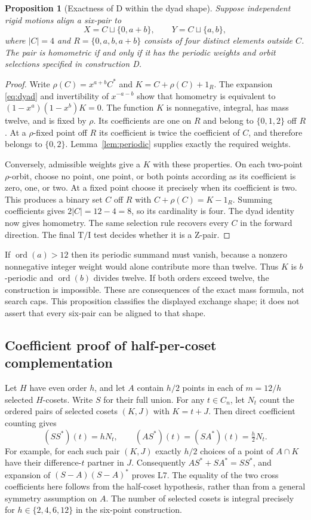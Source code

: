 \documentclass[11pt]{article}
\newtheorem{proposition}[theorem]{Proposition}
\theoremstyle{remark}
\newcommand{\TI}{\mathrm{T/I}}
\newcommand{\ord}{\operatorname{ord}}
\begin{document}
\begin{proposition}[Exactness of D within the dyad shape]\label{prop:dyadshape}
Suppose independent rigid motions align a six-pair to
\[
 X=C\sqcup\{0,a+b\},\qquad Y=C\sqcup\{a,b\},
\]
where $|C|=4$ and $R=\{0,a,b,a+b\}$ consists of four distinct elements
outside $C$. The pair is homometric if and only if it has the periodic
weights and orbit selections specified in construction D.
\end{proposition}
\begin{proof}
Write $\rho(C)=x^{a+b}C^*$ and $K=C+\rho(C)+1_R$.
The expansion \eqref{eq:dyad} and invertibility of $x^{-a-b}$ show that
homometry is equivalent to $(1-x^a)(1-x^b)K=0$. The function $K$ is
nonnegative, integral, has mass twelve, and is fixed by $\rho$.
Its coefficients are one on $R$ and belong to $\{0,1,2\}$ off $R$.
At a $\rho$-fixed point off $R$ its coefficient is twice the coefficient
of $C$, and therefore belongs to $\{0,2\}$. Lemma~\ref{lem:periodic}
supplies exactly the required weights.

Conversely, admissible weights give a $K$ with these properties. On each
two-point $\rho$-orbit, choose no point, one point, or both points according
as its coefficient is zero, one, or two. At a fixed point choose it
precisely when its coefficient is two. This produces a binary set $C$
off $R$ with $C+\rho(C)=K-1_R$. Summing coefficients gives
$2|C|=12-4=8$, so its cardinality is four. The dyad identity now gives
homometry. The same selection rule recovers every $C$ in the forward
direction. The final $\TI$ test decides whether it is a Z-pair.
\end{proof}

If $\ord(a)>12$ then its periodic summand must vanish, because a nonzero
nonnegative integer weight would alone contribute more than twelve.
Thus $K$ is $b$-periodic and $\ord(b)$ divides twelve. If both orders
exceed twelve, the construction is impossible. These are consequences
of the exact mass formula, not search caps. This proposition classifies
the displayed exchange shape; it does not assert that every six-pair
can be aligned to that shape.

\subsection{Coefficient proof of half-per-coset complementation}
Let $H$ have even order $h$, and let $A$ contain $h/2$ points in each
of $m=12/h$ selected $H$-cosets. Write $S$ for their full union. For
any $t\in C_n$, let $N_t$ count the ordered pairs of selected cosets
$(K,J)$ with $K=t+J$. Then direct coefficient counting gives
\[
 (SS^*)(t)=hN_t,\qquad
 (AS^*)(t)=(SA^*)(t)=\tfrac h2N_t.
\]
For example, for each such pair $(K,J)$ exactly $h/2$ choices of a point
of $A\cap K$ have their difference-$t$ partner in $J$. Consequently
$AS^*+SA^*=SS^*$, and expansion of $(S-A)(S-A)^*$ proves L7.
The equality of the two cross coefficients here follows from the
half-coset hypothesis, rather than from a general symmetry assumption
on $A$. The number of selected cosets is integral precisely for
$h\in\{2,4,6,12\}$ in the six-point construction.
\end{document}

